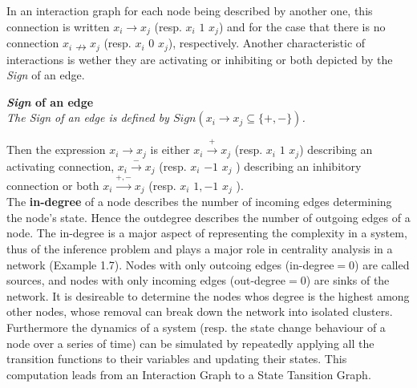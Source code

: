 In an interaction graph for each node being described by another one, this connection is written $x_{i}\rightarrow x_{j}$ (resp. $x_{i}$ $1$ $x_{j}$) and for the case that there is no connection $x_{i}\nrightarrow x_{j}$ (resp. $x_{i}$ $0$ $x_{j}$), respectively.
Another characteristic of interactions is wether they are activating or inhibiting or both depicted by the \textit{Sign} of an edge. 

\begin{defn}\textbf{\textit{Sign} of an edge}\\
\textit{The Sign of an edge is defined by $Sign(x_{i}\rightarrow x_{j} \subseteq \{+,-\})$.}
\end{defn}

Then the expression $x_{i}\rightarrow x_{j}$ is either $x_{i}\xrightarrow{+}  x_{j}$ (resp. $x_{i}$ $1$ $x_{j}$) describing an activating connection, $x_{i}\xrightarrow{-} x_{j}$ (resp. $x_{i}$ $-1$ $x_{j}$ ) describing an inhibitory connection or both $x_{i}\xrightarrow{+,-} x_{j}$ (resp. $x_{i}$ $1,-1$ $x_{j}$ ).\\


The \textbf{in-degree} of a node describes the number of incoming edges determining the node's state. Hence the outdegree describes the number of outgoing edges of a node. The in-degree is a major aspect of representing the complexity in a system, thus of the inference problem and plays a major role in centrality analysis in a network (Example 1.7).
Nodes with only outcoing edges (in-degree$=0$) are called sources, and nodes with only incoming edges (out-degree$=0$) are sinks of the network. It is desireable to determine the nodes whos degree is the highest among other nodes, whose removal can break down the network into isolated clusters.\\

Furthermore the dynamics of a system (resp. the state change behaviour of a node over a series of time) can be simulated by repeatedly applying all the transition functions to their variables and updating their states. This computation leads from an Interaction Graph to a State Tansition Graph.%

